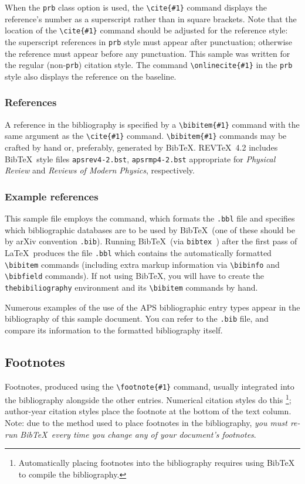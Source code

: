 \documentclass[%
 reprint,
 amsmath,amssymb,
 aps,
]{revtex4-2}
\begin{document}
When the \verb+prb+ class option is used, the \verb+\cite{#1}+ command
displays the reference's number as a superscript rather than in
square brackets. Note that the location of the \verb+\cite{#1}+
command should be adjusted for the reference style: the superscript
references in \verb+prb+ style must appear after punctuation;
otherwise the reference must appear before any punctuation. This
sample was written for the regular (non-\texttt{prb}) citation style.
The command \verb+\onlinecite{#1}+ in the \texttt{prb} style also
displays the reference on the baseline.

\subsubsection{References}
A reference in the bibliography is specified by a \verb+\bibitem{#1}+ command
with the same argument as the \verb+\cite{#1}+ command.
\verb+\bibitem{#1}+ commands may be crafted by hand or, preferably,
generated by Bib\TeX. 
REV\TeX~4.2 includes Bib\TeX\ style files
\verb+apsrev4-2.bst+, \verb+apsrmp4-2.bst+ appropriate for
\textit{Physical Review} and \textit{Reviews of Modern Physics},
respectively.

\subsubsection{Example references}
This sample file employs the \verb++ command, 
which formats the \texttt{\jobname .bbl} file
and specifies which bibliographic databases are to be used by Bib\TeX\ 
(one of these should be by arXiv convention \texttt{\jobname .bib}).
Running Bib\TeX\ (via \texttt{bibtex \jobname}) 
after the first pass of \LaTeX\ produces the file
\texttt{\jobname .bbl} which contains the automatically formatted
\verb+\bibitem+ commands (including extra markup information via
\verb+\bibinfo+ and \verb+\bibfield+ commands). 
If not using Bib\TeX, you will have to create the \verb+thebibiliography+ environment 
and its \verb+\bibitem+ commands by hand.

Numerous examples of the use of the APS bibliographic entry types appear in the bibliography of this sample document.
You can refer to the \texttt{\jobname .bib} file, 
and compare its information to the formatted bibliography itself.

\subsection{Footnotes}%
Footnotes, produced using the \verb+\footnote{#1}+ command, 
usually integrated into the bibliography alongside the other entries.
Numerical citation styles do this%
\footnote{Automatically placing footnotes into the bibliography requires using BibTeX to compile the bibliography.};
author-year citation styles place the footnote at the bottom of the text column.
Note: due to the method used to place footnotes in the bibliography, 
\emph{you must re-run Bib\TeX\ every time you change any of your document's footnotes}. 
\end{document}
